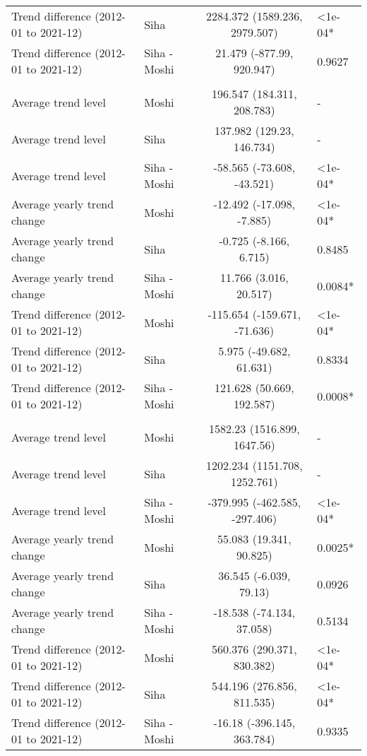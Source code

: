 \begin{longtable}{l|lcl}
Trend difference (2012-01 to 2021-12) & Siha & 2284.372 (1589.236, 2979.507) & <1e-04* \\ 
Trend difference (2012-01 to 2021-12) & Siha - Moshi & 21.479 (-877.99, 920.947) & 0.9627 \\ 
\midrule\addlinespace[2.5pt]
\multicolumn{4}{l}{Trauma} \\[2.5pt] 
\midrule\addlinespace[2.5pt]
Average trend level & Moshi & 196.547 (184.311, 208.783) & - \\ 
Average trend level & Siha & 137.982 (129.23, 146.734) & - \\ 
Average trend level & Siha - Moshi & -58.565 (-73.608, -43.521) & <1e-04* \\ 
Average yearly trend change & Moshi & -12.492 (-17.098, -7.885) & <1e-04* \\ 
Average yearly trend change & Siha & -0.725 (-8.166, 6.715) & 0.8485 \\ 
Average yearly trend change & Siha - Moshi & 11.766 (3.016, 20.517) & 0.0084* \\ 
Trend difference (2012-01 to 2021-12) & Moshi & -115.654 (-159.671, -71.636) & <1e-04* \\ 
Trend difference (2012-01 to 2021-12) & Siha & 5.975 (-49.682, 61.631) & 0.8334 \\ 
Trend difference (2012-01 to 2021-12) & Siha - Moshi & 121.628 (50.669, 192.587) & 0.0008* \\ 
\midrule\addlinespace[2.5pt]
\multicolumn{4}{l}{Urinary Infections} \\[2.5pt] 
\midrule\addlinespace[2.5pt]
Average trend level & Moshi & 1582.23 (1516.899, 1647.56) & - \\ 
Average trend level & Siha & 1202.234 (1151.708, 1252.761) & - \\ 
Average trend level & Siha - Moshi & -379.995 (-462.585, -297.406) & <1e-04* \\ 
Average yearly trend change & Moshi & 55.083 (19.341, 90.825) & 0.0025* \\ 
Average yearly trend change & Siha & 36.545 (-6.039, 79.13) & 0.0926 \\ 
Average yearly trend change & Siha - Moshi & -18.538 (-74.134, 37.058) & 0.5134 \\ 
Trend difference (2012-01 to 2021-12) & Moshi & 560.376 (290.371, 830.382) & <1e-04* \\ 
Trend difference (2012-01 to 2021-12) & Siha & 544.196 (276.856, 811.535) & <1e-04* \\ 
Trend difference (2012-01 to 2021-12) & Siha - Moshi & -16.18 (-396.145, 363.784) & 0.9335 \\ 

\end{longtable}
